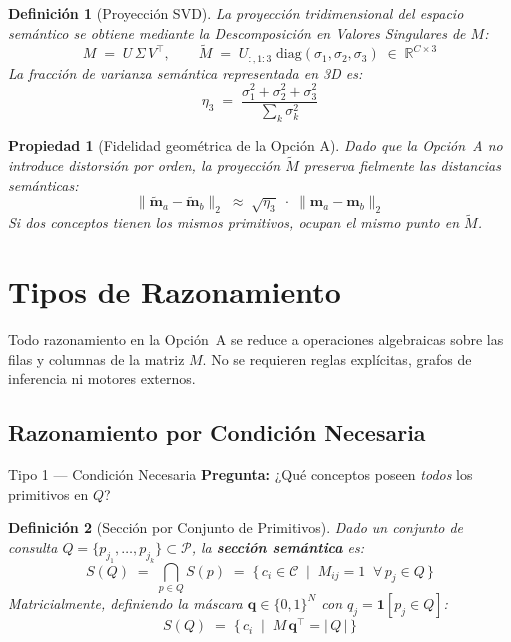 \documentclass[12pt]{article}
\newtheorem{definition}{Definición}[section]
\newtheorem{property}{Propiedad}[section]
\begin{document}
\begin{definition}[Proyección SVD]
	La proyección tridimensional del espacio semántico se obtiene mediante la
	Descomposición en Valores Singulares de $M$:
	\[
	M \;=\; U\,\Sigma\,V^\top, \qquad
	\tilde{M} \;=\; U_{:,1:3}\;\mathrm{diag}(\sigma_1,\sigma_2,\sigma_3)
	\;\in\; \mathbb{R}^{C \times 3}
	\]
	La fracción de varianza semántica representada en 3D es:
	\[
	\eta_3 \;=\; \frac{\sigma_1^2 + \sigma_2^2 + \sigma_3^2}
	{\displaystyle\sum_{k} \sigma_k^2}
	\]
\end{definition}

\begin{property}[Fidelidad geométrica de la Opción A]
	Dado que la Opción~A no introduce distorsión por orden, la proyección
	$\tilde{M}$ preserva fielmente las distancias semánticas:
	\[
	\bigl\|\tilde{\mathbf{m}}_a - \tilde{\mathbf{m}}_b\bigr\|_2
	\;\approx\; \sqrt{\eta_3}\;\cdot\;
	\bigl\|\mathbf{m}_a - \mathbf{m}_b\bigr\|_2
	\]
	Si dos conceptos tienen los mismos primitivos, ocupan el mismo punto en $\tilde{M}$.
\end{property}

\section{Tipos de Razonamiento}

Todo razonamiento en la Opción~A se reduce a operaciones algebraicas sobre las
filas y columnas de la matriz $M$. No se requieren reglas explícitas, grafos de
inferencia ni motores externos.

\subsection{Razonamiento por Condición Necesaria}

\begin{razonbox}{Tipo 1 — Condición Necesaria}
	\textbf{Pregunta:} ¿Qué conceptos poseen \emph{todos} los primitivos en $Q$?
\end{razonbox}

\begin{definition}[Sección por Conjunto de Primitivos]
	Dado un conjunto de consulta $Q = \{p_{j_1}, \ldots, p_{j_k}\} \subset \mathcal{P}$,
	la \textbf{sección semántica} es:
	\[
	S(Q) \;=\; \bigcap_{p \in Q} S(p)
	\;=\; \bigl\{\,c_i \in \mathcal{C}
	\;\mid\; M_{ij} = 1\;\;\forall\, p_j \in Q\,\bigr\}
	\]
	Matricialmente, definiendo la máscara $\mathbf{q} \in \{0,1\}^N$ con
	$q_j = \mathbf{1}[p_j \in Q]$:
	\[
	S(Q) \;=\; \bigl\{\,c_i \;\mid\; M\,\mathbf{q}^\top = |\,Q\,|\,\bigr\}
	\]
\end{definition}
\end{document}
